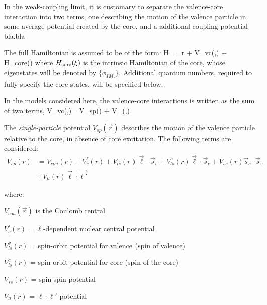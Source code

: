 \documentclass[preprint,12pt]{elsarticle}
\begin{document}
In the weak-coupling limit, it is customary to separate the valence-core interaction into two terms, 
one describing the motion of the valence particle in some average potential created by the core, and 
a additional coupling potential bla,bla



The full Hamiltonian is assumed to be of the form:
\be
H= _r + V_{vc}(,\xi) +   H_{\rm core}(\xi)
\label{hpc}
\ee
where $H_{\rm core}(\xi) $ is 
the intrinsic Hamiltonian of the core, whose eigenstates will be
denoted by $\{\phi_{I M_I} \}$. Additional quantum numbers, required to fully specify the core states,
will be specified below. 

In the models considered here, the valence-core interactions is written as the sum of two terms, 
\be
V_{vc}(,\xi)= V_{sp}() + V_(,\xi)
\ee

The {\em single-particle} potential $V_{sp}(\vec{r})$  describes the  motion 
of the valence particle relative to the core, in absence of core excitation. The following terms 
are considered:
\begin{align}
V_{sp}(r)& = V_{cou}(r)+ V^{\ell}_c(r)
        + V^{v}_{ls}(r) \vec{\ell}\cdot \vec{s}_v 
        + V^{c}_{ls}(r) \vec{\ell}\cdot \vec{s}_c
        + V_{ss}(r) \vec{s}_c \cdot \vec{s}_v     \nonumber \\
      & + V_{ll}(r) \vec{\ell} \cdot \vec{\ell'}
\label{vsp}
\end{align}

where:
\bi
\item $V_{cou}(\vec{r})$ is the Coulomb central
\item  $V^{\ell}_c(r)$   = $\ell$-dependent nuclear central potential
\item $V^{v}_{ls}(r)$  = spin-orbit potential for valence (spin of valence)
\item $V^{c}_{ls}(r)$ = spin-orbit potential for core (spin of the core)
\item $V_{ss}(r)$  = spin-spin potential 
\item $V_{ll}(r)$  = $\ell\cdot \ell'$ potential          
\ei
\end{document}
